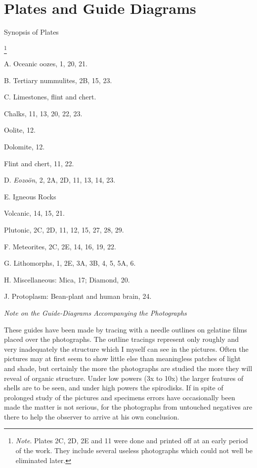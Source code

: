 \documentclass[a4paper, 12pt, oneside]{article}
\begin{document}
\section{Plates and Guide Diagrams}
\centerline{Synopsis of Plates}\footnote{\emph{Note}. Plates 2C, 2D, 2E and 11 were done and printed off at an early period of the work. They include several useless photographs which could not well be eliminated later.}
\bigskip
\begin{description}
    \item A. Oceanic oozes, 1, 20, 21.
    \item B. Tertiary nummulites, 2B, 15, 23.
    \item C. Limestones, flint and chert.
    \item\hspace{15mm}Chalks, 11, 13, 20, 22, 23.
    \item\hspace{15mm}Oolite, 12.
    \item\hspace{15mm}Dolomite, 12.
    \item\hspace{15mm}Flint and chert, 11, 22.
    \item D. \emph{Eozoön}, 2, 2A, 2D, 11, 13, 14, 23.
    \item E. Igneous Rocks
    \item\hspace{15mm}Volcanic, 14, 15, 21.
    \item\hspace{15mm}Plutonic, 2C, 2D, 11, 12, 15, 27, 28, 29.
    \item F. Meteorites, 2C, 2E, 14, 16, 19, 22.
    \item G. Lithomorphs, 1, 2E, 3A, 3B, 4, 5, 5A, 6.
    \item H. Miscellaneous: Mica, 17; Diamond, 20.
    \item J. Protoplasm: Bean-plant and human brain, 24.
\end{description}

\bigskip
\centerline{\emph{Note on the Guide-Diagrams Accompanying the Photographs}}

These guides have been made by tracing with a needle outlines on gelatine films placed over the photographs. The outline tracings represent only roughly and very inadequately the structure which I myself can see in the pictures. Often the pictures may at first seem to show little else than meaningless patches of light and shade, but certainly the more the photographs are studied the more they will reveal of organic structure. Under low powers (3x to 10x) the larger features of shells are to be seen, and under high powers the spirodisks. If in spite of prolonged study of the pictures and specimens errors have occasionally been made the matter is not serious, for the photographs from untouched negatives are there to help the observer to arrive at his own conclusion.
\end{document}
